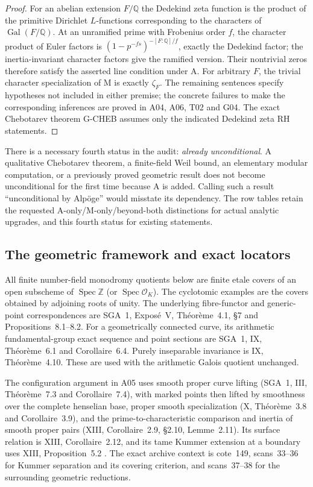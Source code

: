 \begin{proof}
For an abelian extension $F/\mathbb Q$ the Dedekind zeta function
is the product of the primitive Dirichlet $L$-functions corresponding to the
characters of $\operatorname{Gal}(F/\mathbb Q)$. At an unramified
prime with Frobenius order $f$, the character product of Euler
factors is $(1-p^{-fs})^{-[F:\mathbb Q]/f}$, exactly the Dedekind
factor; the inertia-invariant character factors give the ramified
version. Their nontrivial
zeros therefore satisfy the asserted line condition under A.
For arbitrary $F$, the trivial character specialization of M is
exactly $\zeta_F$. The remaining sentences specify hypotheses not
included in either premise; the concrete failures to make the
corresponding inferences are proved in A04, A06, T02 and G04.
The exact Chebotarev theorem G-CHEB assumes only the indicated
Dedekind zeta RH statements.
\end{proof}

There is a necessary fourth status in the audit: \emph{already
unconditional}. A qualitative Chebotarev theorem, a finite-field
Weil bound, an elementary modular computation, or a previously proved
geometric result does not become unconditional for the first time
because A is added. Calling such a result ``unconditional by Alp\"oge''
would misstate its dependency. The row tables retain the requested
A-only/M-only/beyond-both distinctions for actual analytic upgrades,
and this fourth status for existing statements.

\subsection{The geometric framework and exact locators}

All finite number-field monodromy quotients below are finite etale
covers of an open subscheme of $\operatorname{Spec}\mathbb Z$ (or
$\operatorname{Spec}\mathcal O_K$). The cyclotomic examples are the
covers obtained by adjoining roots of unity. The underlying
fibre-functor and generic-point correspondences are SGA~1,
Expos\'e~V, Th\'eor\`eme~4.1, \S7 and Propositions~8.1--8.2.
For a geometrically connected curve, its arithmetic fundamental-group
exact sequence and point sections are SGA~1, IX, Th\'eor\`eme~6.1
and Corollaire~6.4. Purely inseparable invariance is IX,
Th\'eor\`eme~4.10. These are used with the arithmetic Galois quotient
unchanged.

The configuration argument in A05 uses smooth proper curve lifting
(SGA~1, III, Th\'eor\`eme~7.3 and Corollaire~7.4), with marked
points then lifted by smoothness over the complete henselian base,
proper smooth
specialization (X, Th\'eor\`eme~3.8 and Corollaire~3.9), and the
prime-to-characteristic comparison and inertia of smooth proper pairs
(XIII, Corollaire~2.9, \S2.10, Lemme~2.11). Its surface relation is
XIII, Corollaire~2.12, and its tame Kummer extension at a boundary
uses XIII, Proposition~5.2 \cite{SGA1}. The exact archive context is
cote~149, scans~33--36 for Kummer separation and its covering
criterion, and scans~37--38 for the surrounding geometric reductions.

